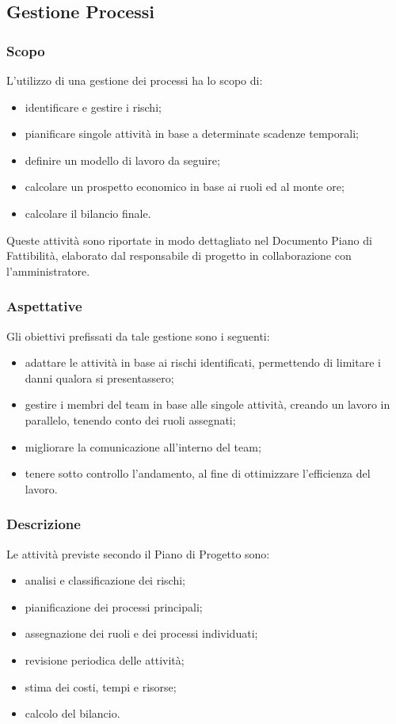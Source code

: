 \subsection{Gestione Processi}

	\subsubsection{Scopo}
	L'utilizzo di una gestione dei processi ha lo scopo di:
	\begin{itemize}
		\item identificare e gestire i rischi;
		\item pianificare singole attività in base a determinate scadenze temporali;
		\item definire un modello di lavoro da seguire;
		\item calcolare un prospetto economico in base ai ruoli ed al monte ore;
		\item calcolare il bilancio finale.
	\end{itemize}
	Queste attività sono riportate in modo dettagliato nel Documento Piano di Fattibilità, elaborato dal responsabile di progetto in collaborazione con l'amministratore.
	
	\subsubsection{Aspettative}
	Gli obiettivi prefissati da tale gestione sono i seguenti:
	\begin{itemize}
		\item adattare le attività in base ai rischi identificati, permettendo di limitare i danni qualora si presentassero;
		\item gestire i membri del team in base alle singole attività, creando un lavoro in parallelo, tenendo conto dei ruoli assegnati;
		\item migliorare la comunicazione all'interno del team;
		\item tenere sotto controllo l'andamento, al fine di ottimizzare l'efficienza del lavoro.
	\end{itemize}

	\subsubsection{Descrizione}
	Le attività previste secondo il Piano di Progetto sono:
	\begin{itemize}
		\item analisi e classificazione dei rischi;
		\item pianificazione dei processi principali;
		\item assegnazione dei ruoli e dei processi individuati;
		\item revisione periodica delle attività;
		\item stima dei costi, tempi e risorse;
		\item calcolo del bilancio.	 
	\end{itemize}

